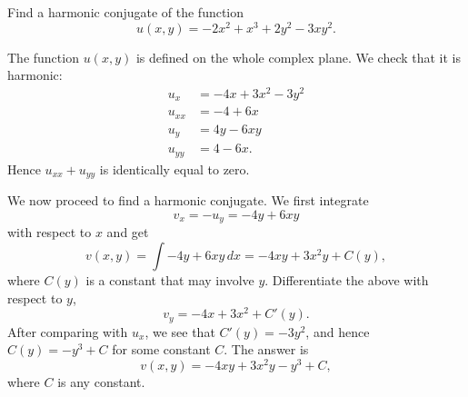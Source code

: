 \begin{example}    \label{ex:harmonic_function}
	Find a harmonic conjugate of the function
	$$
	u(x,y) = -2x^2 + x^3+2y^2-3xy^2.
	$$
	
	The function $u(x,y)$ is defined on the whole complex plane. We check that it is harmonic:
	\begin{align*}
		u_x &= -4x + 3x^2-3y^2 \\
		u_{xx}&= -4 + 6x \\
		u_y &= 4y - 6xy \\
		u_{yy} &= 4-6x.
	\end{align*}
	Hence $u_{xx}+u_{yy}$ is identically equal to zero. 
	
	We now proceed to find a harmonic conjugate. We first integrate
	$$
	v_x = -u_y = -4y + 6xy
	$$
	with respect to $x$ and get
	$$
	v(x,y) = \int -4y + 6xy\, dx = -4xy + 3x^2 y  + C(y),
	$$
	where $C(y)$ is a constant that may involve $y$. Differentiate the above with respect to $y$,
	$$
	v_y = -4x+3x^2+C'(y).
	$$
	After comparing with $u_x$, we see that $C'(y) = -3y^2$, and hence $C(y) = -y^3 + C$ for some constant $C$. The answer is
	$$
	v(x,y) = -4xy + 3x^2 y -y^3 + C,
	$$
	where $C$ is any constant.	
\end{example}

